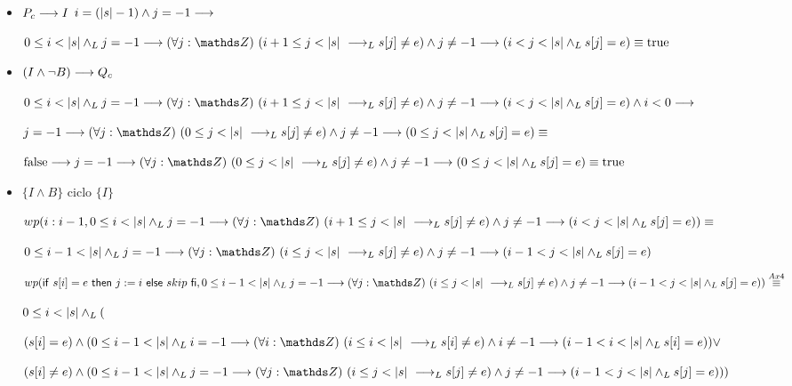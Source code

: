 \documentclass{article}
\begin{document}
\begin{itemize}
    \item $P_{c} \longrightarrow I$
    $i = (|s| - 1) \wedge j = -1 \longrightarrow$

    $0 \leq i < \longitud{s} \yLuego j = -1 \implica \paraTodo{j}{(i+1}{\longitud{s}} \implicaLuego s[j] \neq e) \wedge j \neq -1 \implica (i < j < \longitud{s} \yLuego s[j]=e) \equiv \True$

    \item $(I \wedge \neg B) \longrightarrow Q_{c}$
    
    $0 \leq i < \longitud{s} \yLuego j = -1 \implica \paraTodo{j}{(i+1}{\longitud{s}} \implicaLuego s[j] \neq e) \wedge j \neq -1 \implica (i < j < \longitud{s} \yLuego s[j]=e) \wedge i < 0 \implica$

    $j = -1 \implica \paraTodo{j}{(0}{\longitud{s}} \implicaLuego s[j] \neq e) \wedge j \neq -1 \implica (0 \leq j < \longitud{s}\yLuego s[j]=e) \equiv$

    $\False \implica j = -1 \implica \paraTodo{j}{(0}{\longitud{s}} \implicaLuego s[j] \neq e) \wedge j \neq -1 \implica (0 \leq j < \longitud{s}\yLuego s[j]=e) \equiv \True$

    \item $\{I \wedge B\}$ ciclo $\{ I \}$
    
    $wp(i:i-1, 0 \leq i < \longitud{s} \yLuego j = -1 \implica \paraTodo{j}{(i+1}{\longitud{s}} \implicaLuego s[j] \neq e) \wedge j \neq -1 \implica (i < j < \longitud{s} \yLuego s[j]=e))\equiv$

    $0 \leq i-1 < \longitud{s} \yLuego j = -1 \implica \paraTodo{j}{(i}{\longitud{s}} \implicaLuego s[j] \neq e) \wedge j \neq -1 \implica (i-1 < j < \longitud{s} \yLuego s[j]=e)$

    $wp(\IfThenElse{s[i]=e}{j:=i}{skip},0 \leq i-1 < \longitud{s} \yLuego j = -1 \implica \paraTodo{j}{(i}{\longitud{s}} \implicaLuego s[j] \neq e) \wedge j \neq -1 \implica (i-1 < j < \longitud{s} \yLuego s[j]=e)) \stackrel{Ax4}{\equiv}$

    $0 \leq i < |s| \land _L ( $
    
    $(s[i] = e) \wedge (0 \leq i-1 < \longitud{s} \yLuego i = -1 \implica \paraTodo{i}{(i}{\longitud{s}} \implicaLuego s[i] \neq e) \wedge i \neq -1 \implica (i-1 < i < \longitud{s} \yLuego s[i]=e) ) \vee$

    $(s[i] \neq e) \wedge ( 0 \leq i-1 < \longitud{s} \yLuego j = -1 \implica \paraTodo{j}{(i}{\longitud{s}} \implicaLuego s[j] \neq e) \wedge j \neq -1 \implica (i-1 < j < \longitud{s} \yLuego s[j]=e)))$ \\


\end{itemize}
\end{document}
